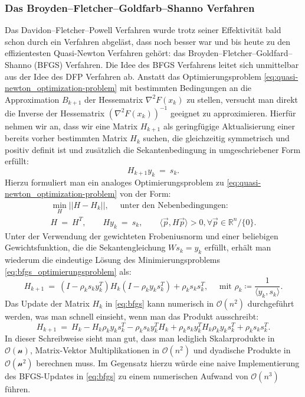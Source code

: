 \subsubsection{Das Broyden--Fletcher--Goldfarb--Shanno Verfahren}
Das Davidon--Fletcher--Powell Verfahren wurde trotz seiner Effektivität bald schon durch ein Verfahren abgeläst, dass noch besser war und bis heute zu den effizientesten Quasi-Newton Verfahren gehört: das Broyden--Fletcher--Goldfard--Shanno (BFGS) Verfahren.
Die Idee des BFGS Verfahrens leitet sich unmittelbar aus der Idee des DFP Verfahren ab.
Anstatt das Optimierungsproblem \eqref{eq:quasi-newton_optimization-problem} mit bestimmten Bedingungen an die Approximation $B_{k+1}$ der Hessematrix $\nabla^2 F(x_k)$ zu stellen, versucht man direkt die Inverse der Hessematrix $(\nabla^2 F(x_k))^{-1}$ geeignet zu approximieren.
Hierfür nehmen wir an, dass wir eine Matrix $H_{k+1}$ als geringfügige Aktualisierung einer bereits vorher bestimmten Matrix $H_k$ suchen, die gleichzeitig symmetrisch und positiv definit ist und zusätzlich die Sekantenbedingung in umgeschriebener Form erfüllt:
\begin{equation*}
H_{k+1}y_k \ = \ s_k.
\end{equation*}
Hierzu formuliert man ein analoges Optimierungsproblem zu \eqref{eq:quasi-newton_optimization-problem} von der Form:
\begin{equation}
\label{eq:bfgs_optimierungsproblem}
\begin{split}
\min_{H} || H - H_k ||, \quad \text{ unter den Nebenbedingungen: } \\
H \ = \ H^T, \qquad H y_k \ = \ s_k, \qquad \langle \vec{p}, H\vec{p} \rangle > 0, \forall \vec{p} \in \mathbb{R}^n / \lbrace 0 \rbrace.
\end{split}
\end{equation}
Unter der Verwendung der gewichteten Frobeniusnorm und einer beliebigen Gewichtsfunktion, die die Sekantengleichung $Ws_k = y_k$ erfüllt, erhält man wiederum die eindeutige Lösung des Minimierungsproblems \eqref{eq:bfgs_optimierungsproblem} als:
\begin{equation}
\label{eq:bfgs}
H_{k+1} \ = \ (I - \rho_k s_k y_k^T) H_k (I - \rho_k y_k s_k^T) + \rho_k s_k s_k^T, \quad \text{ mit } \rho_k \coloneqq \frac{1}{\langle y_k, s_k \rangle}.
\end{equation}
Das Update der Matrix $H_k$ in \eqref{eq:bfgs} kann numerisch in $\mathcal{O}(n^2)$ durchgeführt werden, was man schnell einsieht, wenn man das Produkt ausschreibt:
\begin{equation*}
H_{k+1} \ = \ H_k - H_k\rho_k y_k s_k^T - \rho_k s_k y_k^T H_k + \rho_k s_k y_k^T H_k \rho_k y_k s_k^T + \rho_k s_k s_k^T.
\end{equation*}
In dieser Schreibweise sieht man gut, dass man lediglich Skalarprodukte in $\mathcal{O(n)}$, Matrix-Vektor Multiplikationen in $\mathcal{O}(n^2)$ und dyadische Produkte in $\mathcal{O(n^2)}$ berechnen muss.
Im Gegensatz hierzu würde eine naive Implementierung des BFGS-Updates in \eqref{eq:bfgs} zu einem numerischen Aufwand von $\mathcal{O}(n^3)$ führen.

